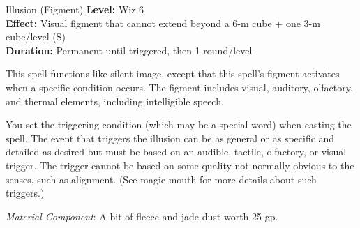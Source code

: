 {Illusion (Figment)}
{
	\textbf{Level:}
	Wiz 6\\
	\textbf{Effect:}
	Visual figment that cannot extend beyond a 6-m cube + one 3-m cube/level (S)\\
	\textbf{Duration:}
	Permanent until triggered, then 1 round/level\\
}
{
	This spell functions like silent image, except that this spell's figment activates when a specific condition occurs. The figment includes visual, auditory, olfactory, and thermal elements, including intelligible speech.

	You set the triggering condition (which may be a special word) when casting the spell. The event that triggers the illusion can be as general or as specific and detailed as desired but must be based on an audible, tactile, olfactory, or visual trigger. The trigger cannot be based on some quality not normally obvious to the senses, such as alignment. (See magic mouth for more details about such triggers.)

	\textit{Material Component}:
	A bit of fleece and jade dust worth 25 gp.

}
